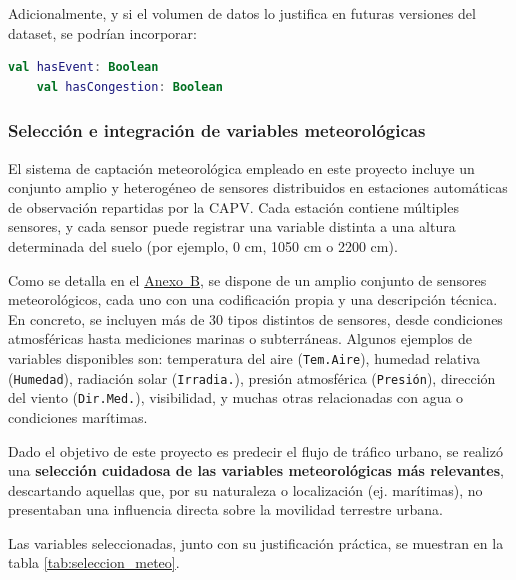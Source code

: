 Adicionalmente, y si el volumen de datos lo justifica en futuras versiones del dataset, se podrían incorporar:

\begin{lstlisting}[language=Kotlin, caption={Variables opcionales}]
	val hasEvent: Boolean
	val hasCongestion: Boolean
\end{lstlisting}

\subsubsection*{Selección e integración de variables meteorológicas}

El sistema de captación meteorológica empleado en este proyecto incluye un conjunto amplio y heterogéneo de sensores distribuidos en estaciones automáticas de observación repartidas por la CAPV. Cada estación contiene múltiples sensores, y cada sensor puede registrar una variable distinta a una altura determinada del suelo (por ejemplo, 0 cm, 1050 cm o 2200 cm). 

Como se detalla en el \hyperref[anexo:sensores]{Anexo~B}, se dispone de un amplio conjunto de sensores meteorológicos, cada uno con una codificación propia y una descripción técnica. En concreto, se incluyen más de 30 tipos distintos de sensores, desde condiciones atmosféricas hasta mediciones marinas o subterráneas. Algunos ejemplos de variables disponibles son: temperatura del aire (\texttt{Tem.Aire}), humedad relativa (\texttt{Humedad}), radiación solar (\texttt{Irradia.}), presión atmosférica (\texttt{Presión}), dirección del viento (\texttt{Dir.Med.}), visibilidad, y muchas otras relacionadas con agua o condiciones marítimas. 

Dado el objetivo de este proyecto es predecir el flujo de tráfico urbano, se realizó una \textbf{selección cuidadosa de las variables meteorológicas más relevantes}, descartando aquellas que, por su naturaleza o localización (ej. marítimas), no presentaban una influencia directa sobre la movilidad terrestre urbana.

Las variables seleccionadas, junto con su justificación práctica, se muestran en la tabla \ref{tab:seleccion_meteo}.

